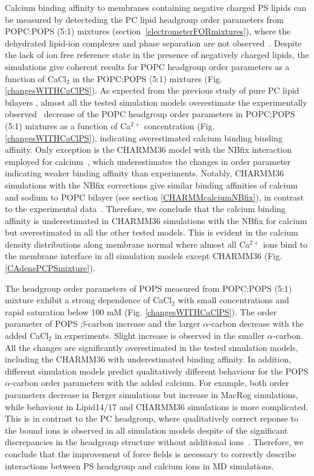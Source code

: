 \documentclass[aps,prl,superscriptaddress,twocolumn]{revtex4}
\begin{document}
Calcium binding affinity to membranes containing negative charged PS lipids can be
measured by detecteding the PC lipid headgroup order parameters
from POPC:POPS (5:1) mixtures (section~\ref{electrometerFORmixtures}),
where the dehydrated lipid-ion complexes and phase separation are 
not observed~\cite{feigenson86,mattai89,roux90,roux91}.
Despite the lack of ion free reference state
in the presence of negatively charged lipids, the simulations give
coherent results for POPC headgroup order parameters as a function of
CaCl$_2$ in the POPC:POPS (5:1) mixtures (Fig. \ref{changesWITHCaClPS}).
As expected from the previous study of pure PC lipid
bilayers \cite{catte16}, almost all the tested simulation models overestimate the
experimentally observed~\cite{roux90} decrease of the POPC headgroup order parameters
in POPC:POPS (5:1) mixtures as a function of Ca$^{2+}$ concentration (Fig. \ref{changesWITHCaClPS}),
indicating overestimated calcium binding binding affinity.
Only exception is the CHARMM36 model with the NBfix
interaction employed for calcium~\cite{kim16}, which underestimates the changes in order parameter 
indicating weaker binding affinity than experiments.
Notably, CHARMM36 simulations with the NBfix corrections \cite{venable13,kim16} give similar binding affinities of
calcium and sodium to POPC bilayer (see section \ref{CHARMMcalciumNBfix}), in contrast to the experimental 
data~\cite{cevc90,akutsu81,altenbach84}. Therefore, we conclude that the calcium binding affinity
is underestimated in CHARMM36 simulations with the NBfix for calcium \cite{kim16} but overestimated 
in all the other tested models. This is evident in the calcium density distributions
along membrane normal where almost all Ca$^{2+}$ ions bind to the membrane interface in
all simulation models except CHARMM36 (Fig. \ref{CAdensPCPSmixture}).


The headgroup order parameters of POPS measured from POPC:POPS (5:1) mixture
exhibit a strong dependence of CaCl$_2$ with small concentrations and rapid saturation
below 100 mM (Fig. \ref{changesWITHCaClPS}).
The order parameter of POPS $\beta$-carbon increase and the larger $\alpha$-carbon 
decrease with the added CaCl$_2$ in experiments. Slight increase is observed in
the smaller $\alpha$-carbon. All the changes are significantly overestimated in the
tested simulation models, including the CHARMM36 with underestimated binding affinity.
In addition, different simulation models predict qualitatively different behaviour
for the POPS $\alpha$-carbon order parameters with the added calcium.
For example, both order parameters decrease in Berger simulations but increase
in MacRog simulations, while behaviour in Lipid14/17 and CHARMM36 simulations is
more complicated. This is in contrast to the PC headgroup, where
qualitatively correct reponse to the bound ions is observed
in all simulation models despite of the significant discrepancies in the headgroup
structure without additional ions~\cite{catte16}. Therefore, we conclude that
the improvement of force fields is necessary to correctly describe interactions between
PS headgroup and calcium ions in MD simulations.
\end{document}
